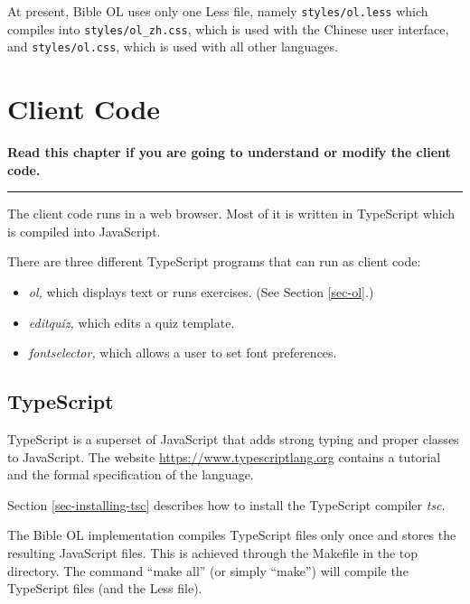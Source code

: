 \documentclass[11pt,oneside,a4paper]{memoir}
\begin{document}
At present, Bible OL uses only one Less file, namely \texttt{styles/ol.less} which compiles into
\texttt{styles/ol\_zh.css}, which is used with the Chinese user interface, and
\texttt{styles/ol.css}, which is used with all other languages.

\HERTIL
\chapter{Client Code}\label{chap-client-code}

\textbf{Read this chapter if you are going to understand or modify the client code.}
\plainbreak{3}

The client code runs in a web browser. Most of it is written in TypeScript which is compiled into
JavaScript.

There are three different TypeScript programs that can run as client code:


\begin{itemize}
\item \emph{ol,} which displays text or runs exercises. (See Section \ref{sec-ol}.)
\item \emph{editquiz,} which edits a quiz template.
\item \emph{fontselector,} which allows a user to set font preferences.
\end{itemize}

\section{TypeScript}\label{sec-typescript-use}

TypeScript is a superset of JavaScript that adds strong typing and proper classes to JavaScript.
The website \url{https://www.typescriptlang.org} contains a tutorial and the formal specification of
the language.

Section \ref{sec-installing-tsc} describes how to install the TypeScript compiler \emph{tsc}.

The Bible OL implementation compiles TypeScript files only once and stores the resulting JavaScript
files. This is achieved through the Makefile in the top directory. The command ``make all'' (or
simply ``make'') will compile the TypeScript files (and the Less file).
\end{document}
